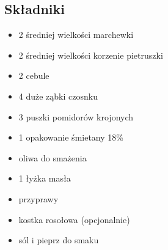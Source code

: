 \documentclass[a4paper,10pt]{book}
\begin{document}
\begin{multicols}{2}

\subsection*{Składniki}
\begin{itemize}
    \item 2 średniej wielkości marchewki
    \item 2 średniej wielkości korzenie pietruszki
    \item 2 cebule
    \item 4 duże ząbki czosnku
    \item 3 puszki pomidorów krojonych
    \item 1 opakowanie śmietany 18\%
    \item oliwa do smażenia
    \item 1 łyżka masła
    \item przyprawy
    \item kostka rosołowa (opcjonalnie)
    \item sól i pieprz do smaku
\end{itemize}

\columnbreak

\begin{figure}[H]
    \centering
\end{figure}
\end{multicols}

\vspace{0.5cm} 
\end{document}
